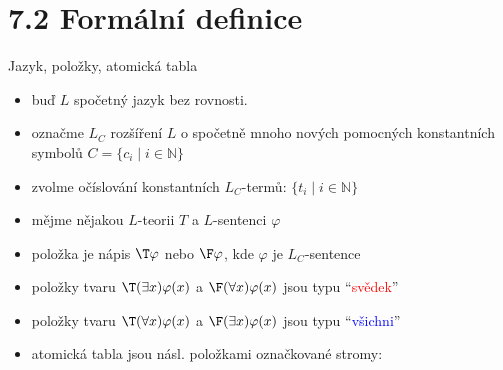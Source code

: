 \documentclass{beamer}
\begin{document}
\section{7.2 Formální definice}


\begin{frame}{Jazyk, položky, atomická tabla}

    \begin{itemize}[<+->]
        \item buď $L$ \alert{spočetný} jazyk \alert{bez rovnosti}.
        \item označme $L_C$ rozšíření $L$ o spočetně mnoho nových \alert{pomocných} konstantních symbolů $C=\{c_i\mid i\in \mathbb N\}$
        \item zvolme očíslování konstantních $L_C$-termů: $\{t_i\mid i\in\mathbb N\}$
        \item mějme nějakou $L$-teorii $T$ a $L$-sentenci $\varphi$
        \item \alert{položka} je nápis $\T\varphi$ nebo $\F\varphi$, kde $\varphi$ je $L_C$-sentence
        \item položky tvaru $\T(\exists x)\varphi(x)$ a $\F(\forall x)\varphi(x)$ jsou \alert{typu} ``\textcolor{red}{svědek}''
        \item položky tvaru $\T(\forall x)\varphi(x)$ a $\F(\exists x)\varphi(x)$ jsou \alert{typu} ``\textcolor{blue}{všichni}'' 
        \item \alert{atomická tabla} jsou násl. položkami označkované stromy:
    \end{itemize}

\end{frame}
\end{document}
